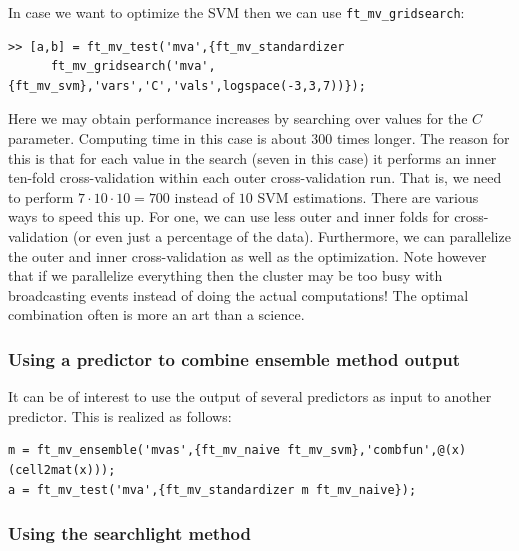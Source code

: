 \documentclass{article}
\renewcommand{\t}[1]{{\tt #1}}
\begin{document}
In case we want to optimize the SVM then we can use \t{ft\_mv\_gridsearch}:
\begin{verbatim}
>> [a,b] = ft_mv_test('mva',{ft_mv_standardizer 
      ft_mv_gridsearch('mva',{ft_mv_svm},'vars','C','vals',logspace(-3,3,7))});

\end{verbatim}
Here we may obtain performance increases by searching over values for the $C$ parameter. Computing time in this case is about  300 times longer. The reason for this is that for each value in the search (seven in this case) it performs an inner ten-fold cross-validation within each outer cross-validation run. That is, we need to perform $7 \cdot 10 \cdot 10=700$ instead of $10$ SVM estimations. There are various ways to speed this up. For one, we can use less outer and inner folds for cross-validation (or even just a percentage of the data). Furthermore, we can parallelize the outer and inner cross-validation as well as the optimization. Note however that if we parallelize everything then the cluster may be too busy with broadcasting events instead of doing the actual computations! The optimal combination often is more an art than a science.

\subsubsection*{Using a predictor to combine ensemble method output}
It can be of interest to use the output of several predictors as input to another predictor. This is realized as follows:
\begin{verbatim}
m = ft_mv_ensemble('mvas',{ft_mv_naive ft_mv_svm},'combfun',@(x)(cell2mat(x)));
a = ft_mv_test('mva',{ft_mv_standardizer m ft_mv_naive});
\end{verbatim}

\subsubsection*{Using the searchlight method}
\end{document}
